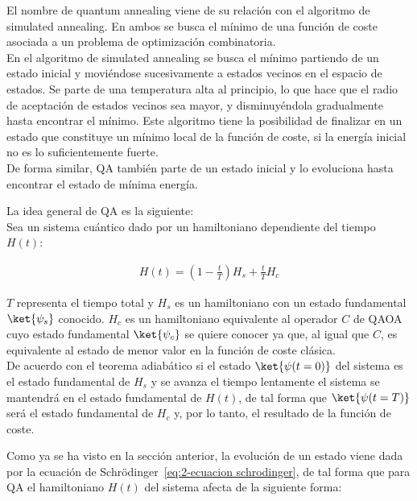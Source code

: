 
El nombre de quantum annealing viene de su relación con el algoritmo de simulated annealing.
En ambos se busca el mínimo de una función de coste asociada a un problema de optimización combinatoria.
\\
En el algoritmo de simulated annealing se busca el mínimo partiendo de un estado inicial y moviéndose sucesivamente a estados vecinos en el espacio de estados.
Se parte de una temperatura alta al principio, lo que hace que el radio de aceptación de estados vecinos sea mayor, y disminuyéndola gradualmente hasta encontrar el mínimo.
Este algoritmo tiene la posibilidad de finalizar en un estado que constituye un mínimo local de la función de coste, si la energía inicial no es lo suficientemente fuerte.
\\
De forma similar, QA también parte de un estado inicial y lo evoluciona hasta encontrar el estado de mínima energía.

La idea general de QA es la siguiente:
\\
Sea un sistema cuántico dado por un hamiltoniano dependiente del tiempo $H(t)$:

\begin{align*}
  H(t) = (1-\frac{t}{T})H_s + \frac{t}{T}H_c
\end{align*}

$T$ representa el tiempo total y $H_s$ es un hamiltoniano con un estado fundamental $\ket{\psi_s}$ conocido.
$H_c$ es un hamiltoniano equivalente al operador $C$ de QAOA cuyo estado fundamental $\ket{\psi_c}$ se quiere conocer ya que, al igual que $C$, es equivalente al estado de menor valor en la función de coste clásica.
\\
De acuerdo con el teorema adiabático si el estado $\ket{\psi(t=0)}$ del sistema es el estado fundamental de $H_s$ y se avanza el tiempo lentamente el sistema se mantendrá en el estado fundamental de $H(t)$, de tal forma que $\ket{\psi(t=T)}$ será el estado fundamental de $H_c$ y, por lo tanto, el resultado de la función de coste.

Como ya se ha visto en la sección anterior, la evolución de un estado viene dada por la ecuación de Schrödinger~\ref{eq:2-ecuacion schrodinger}, de tal forma que para QA el hamiltoniano $H(t)$ del sistema afecta de la siguiente forma:


